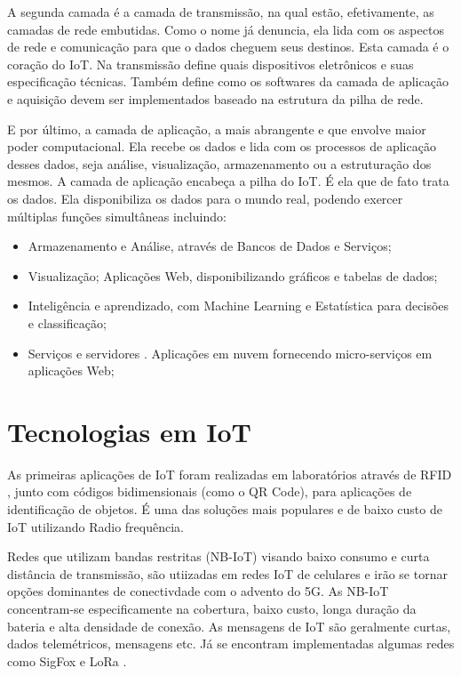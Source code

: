 A segunda camada é a camada de transmissão, na qual estão, efetivamente, as camadas de rede embutidas. Como o nome já denuncia, ela lida com os aspectos de rede e comunicação para que o dados cheguem seus destinos. Esta camada é o coração do IoT. Na transmissão define quais dispositivos eletrônicos e suas especificação técnicas. Também define como os softwares da camada de aplicação e aquisição devem ser implementados baseado na estrutura da pilha de rede.

 E por último, a camada de aplicação, a mais abrangente e que envolve maior poder computacional. Ela recebe os dados e lida com os processos de aplicação desses dados, seja análise, visualização, armazenamento ou a estruturação dos mesmos. A camada de aplicação encabeça a pilha do IoT. É ela que de fato trata os dados. Ela disponibiliza os dados para o mundo real, podendo exercer múltiplas funções simultâneas incluindo:

\begin{itemize}
\item Armazenamento e Análise, através de Bancos de Dados e Serviços;
\item Visualização; Aplicações Web, disponibilizando gráficos e tabelas de dados;
\item Inteligência e aprendizado, com Machine Learning e Estatística para decisões e classificação;
\item Serviços e servidores . Aplicações em nuvem fornecendo micro-serviços em aplicações Web;
\end{itemize}


\section{Tecnologias em IoT}
\label{section:tecnologias_iot}

As primeiras aplicações de IoT foram realizadas em laboratórios através de RFID \cite{Rampim:iot}, junto com códigos bidimensionais (como o QR Code), para aplicações de identificação de objetos.  É uma das soluções mais populares e de baixo custo de IoT utilizando Radio frequência.

Redes que utilizam bandas restritas (NB-IoT) visando baixo consumo e curta distância de transmissão, são utiizadas em redes IoT de celulares e irão se tornar opções dominantes de conectivdade com o advento do 5G. As NB-IoT concentram-se especificamente na cobertura, baixo custo, longa duração da bateria e alta densidade de conexão. As mensagens de IoT são geralmente curtas, dados telemétricos, mensagens etc. Já se encontram implementadas algumas redes como SigFox \cite{Sigfox} e LoRa \cite{LoRa}. 

